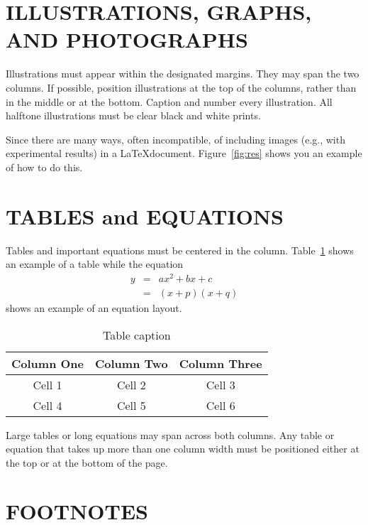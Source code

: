 \documentclass{article}
\begin{document}
\section{ILLUSTRATIONS, GRAPHS, AND PHOTOGRAPHS}
\label{sec:illust}

Illustrations must appear within the designated margins.  They may
span the two columns.  If possible, position illustrations at the
top of the columns, rather than in the middle or at the bottom.
Caption and number every illustration. All halftone illustrations
must be clear black and white prints.

Since there are many ways, often incompatible, of including images
(e.g., with experimental results) in a \LaTeX document.
Figure~\ref{fig:res} shows you an example of how to do this.


\section{TABLES and EQUATIONS}
\label{sec:tabEqn}

Tables and important equations must be centered in the column.
Table~\ref{tab:cap} shows an example of a table while the equation
\begin{eqnarray}
y &=& ax^2+bx+c
\nonumber
\\
~ &=& (x+p)(x+q)
\end{eqnarray}
shows an example of an equation layout.

\begin{table}[t]
\begin{center}
\caption{Table caption} \label{tab:cap}
\begin{tabular}{|c|c|c|}
  \hline
  Column One & Column Two & Column Three
  \\
  \hline
  Cell 1 & Cell 2 & Cell 3 \\
  Cell 4 & Cell 5 & Cell 6 \\
  \hline
\end{tabular}
\end{center}
\end{table}

Large tables or long equations may span across both columns. Any
table or equation that takes up more than one column width must be
positioned either at the top or at the bottom of the page.



\section{FOOTNOTES}
\label{sec:foot}
\end{document}
